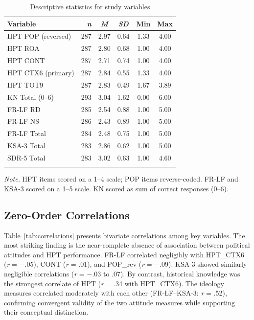 \documentclass[referee,pdflatex,sn-apa]{sn-jnl}
\begin{document}
\begin{table}[!t]
\caption{Descriptive statistics for study variables}\label{tab:descriptive}
\begin{tabular}{lrcccc}
\toprule
Variable & \textit{n} & \textit{M} & \textit{SD} & Min & Max \\
\midrule
HPT POP (reversed) & 287 & 2.97 & 0.64 & 1.33 & 4.00 \\
HPT ROA & 287 & 2.80 & 0.68 & 1.00 & 4.00 \\
HPT CONT & 287 & 2.71 & 0.74 & 1.00 & 4.00 \\
HPT CTX6 (primary) & 287 & 2.84 & 0.55 & 1.33 & 4.00 \\
HPT TOT9 & 287 & 2.83 & 0.49 & 1.67 & 3.89 \\
KN Total (0--6) & 293 & 3.04 & 1.62 & 0.00 & 6.00 \\
FR-LF RD & 285 & 2.54 & 0.88 & 1.00 & 5.00 \\
FR-LF NS & 286 & 2.43 & 0.89 & 1.00 & 5.00 \\
FR-LF Total & 284 & 2.48 & 0.75 & 1.00 & 5.00 \\
KSA-3 Total & 283 & 2.86 & 0.62 & 1.00 & 5.00 \\
SDR-5 Total & 283 & 3.02 & 0.63 & 1.00 & 4.60 \\
\botrule
\end{tabular}

\medskip\noindent\small\textit{Note.} HPT items scored on a 1--4 scale; POP items reverse-coded. FR-LF and KSA-3 scored on a 1--5 scale. KN scored as sum of correct responses (0--6).
\end{table}

\subsection{Zero-Order Correlations}\label{subsec:correlations}

Table~\ref{tab:correlations} presents bivariate correlations among key variables. The most striking finding is the near-complete absence of association between political attitudes and HPT performance. FR-LF correlated negligibly with HPT\_CTX6 (\textit{r} = $-$.05), CONT (\textit{r} = .01), and POP\_rev (\textit{r} = $-$.09). KSA-3 showed similarly negligible correlations (\textit{r} = $-$.03 to .07). By contrast, historical knowledge was the strongest correlate of HPT (\textit{r} = .34 with HPT\_CTX6). The ideology measures correlated moderately with each other (FR-LF--KSA-3: \textit{r} = .52), confirming convergent validity of the two attitude measures while supporting their conceptual distinction.
\end{document}
